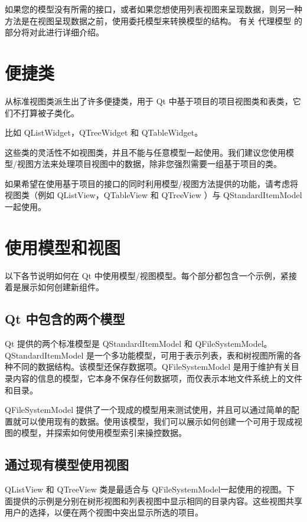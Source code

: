 如果您的模型没有所需的接口，或者如果您想使用列表视图来呈现数据，则另一种方法是在视图呈现数据之前，使用委托模型来转换模型的结构。 有关 代理模型 的部分将对此进行详细介绍。

\section{便捷类}

从标准视图类派生出了许多便捷类，用于 Qt 中基于项目的项目视图类和表类，它们不打算被子类化。

比如 QListWidget，QTreeWidget 和 QTableWidget。

这些类的灵活性不如视图类，并且不能与任意模型一起使用。我们建议您使用模型/视图方法来处理项目视图中的数据，除非您强烈需要一组基于项目的类。

如果希望在使用基于项目的接口的同时利用模型/视图方法提供的功能，请考虑将视图类（例如 QListView，QTableView 和 QTreeView ）与 QStandardItemModel 一起使用。

\section{使用模型和视图}

以下各节说明如何在 Qt 中使用模型/视图模型。每个部分都包含一个示例，紧接着是展示如何创建新组件。

\subsection{Qt 中包含的两个模型}

Qt 提供的两个标准模型是 QStandardItemModel 和 QFileSystemModel。QStandardItemModel 是一个多功能模型，可用于表示列表，表和树视图所需的各种不同的数据结构。该模型还保存数据项。QFileSystemModel 是用于维护有关目录内容的信息的模型，它本身不保存任何数据项，而仅表示本地文件系统上的文件和目录。

QFileSystemModel 提供了一个现成的模型用来测试使用，并且可以通过简单的配置就可以使用现有的数据。使用该模型，我们可以展示如何创建一个可用于现成视图的模型，并探索如何使用模型索引来操控数据。

\subsection{通过现有模型使用视图}

QListView 和 QTreeView 类是最适合与 QFileSystemModel一起使用的视图。下面提供的示例是分别在树形视图和列表视图中显示相同的目录内容。这些视图共享用户的选择，以便在两个视图中突出显示所选的项目。

